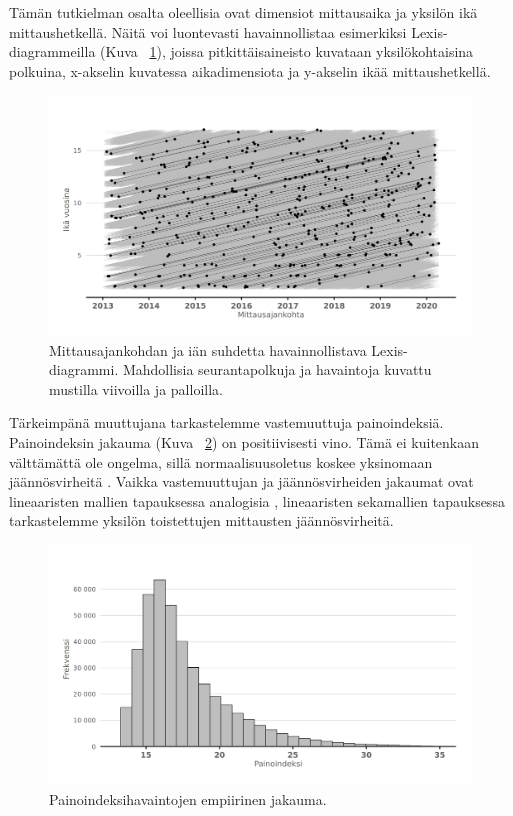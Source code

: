 \documentclass[finnish]{docopts}
\begin{document}
Tämän tutkielman osalta oleellisia ovat dimensiot mittausaika ja yksilön ikä mittaushetkellä. Näitä voi luontevasti havainnollistaa esimerkiksi Lexis-diagrammeilla (Kuva ~\ref{fig:lexisplot}), joissa pitkittäisaineisto kuvataan yksilökohtaisina polkuina, x-akselin kuvatessa aikadimensiota ja y-akselin ikää mittaushetkellä.\\

\begin{figure}[H]
\centering
  \includegraphics[scale=0.8]{kuvaajat/lex_plot.png}
  \caption{Mittausajankohdan ja iän suhdetta havainnollistava Lexis-diagrammi. Mahdollisia seurantapolkuja ja havaintoja kuvattu mustilla viivoilla ja palloilla.}
  \label{fig:lexisplot}
\end{figure}

Tärkeimpänä muuttujana tarkastelemme vastemuuttuja painoindeksiä. Painoindeksin jakauma (Kuva ~\ref{fig:bmi_dens}) on positiivisesti vino. Tämä ei kuitenkaan välttämättä ole ongelma, sillä normaalisuusoletus koskee yksinomaan jäännösvirheitä \cite{west14}. Vaikka vastemuuttujan ja jäännösvirheiden jakaumat ovat lineaaristen mallien tapauksessa analogisia \cite{fitzmaurice11}, lineaaristen sekamallien tapauksessa tarkastelemme yksilön toistettujen mittausten jäännösvirheitä.\\

\begin{figure}[ht]
\centering
  \includegraphics[scale=0.8]{kuvaajat/bmi_dens.png}
  \caption{Painoindeksihavaintojen empiirinen jakauma.}
  \label{fig:bmi_dens}
\end{figure}
\end{document}
